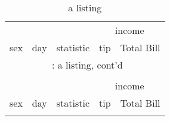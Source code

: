 \documentclass{article}
\begin{document}
\hypertarget{a listing}{} 
\begin{longtable}{p{3cm}llll}
\caption{a listing}\\
\toprule
\multicolumn{3}{c}{}&\multicolumn{2}{c}{income} \\
\cmidrule(lr){4-5}
sex & day & statistic & tip & Total Bill\\
\hline
\endfirsthead
\multicolumn{5}{c}{\tablename~\thetable{}: a listing, cont'd}\\\\
\toprule
\multicolumn{3}{c}{}&\multicolumn{2}{c}{income} \\
\cmidrule(lr){4-5}
sex & day & statistic & tip & Total Bill\\
\hline
\endhead \hline \endfoot \hline


\end{longtable}
\end{document}

